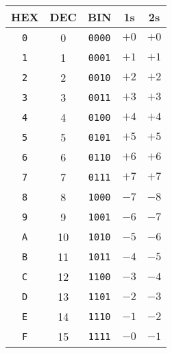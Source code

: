 \begin{tabular*}{\linewidth}{@{\extracolsep{\fill}}ccccc}
    \toprule
    HEX        & DEC & BIN           & 1s   & 2s   \\
    \midrule
    \texttt{0} & 0   & \texttt{0000} & $+0$ & $+0$ \\
    \texttt{1} & 1   & \texttt{0001} & $+1$ & $+1$ \\
    \texttt{2} & 2   & \texttt{0010} & $+2$ & $+2$ \\
    \texttt{3} & 3   & \texttt{0011} & $+3$ & $+3$ \\
    \texttt{4} & 4   & \texttt{0100} & $+4$ & $+4$ \\
    \texttt{5} & 5   & \texttt{0101} & $+5$ & $+5$ \\
    \texttt{6} & 6   & \texttt{0110} & $+6$ & $+6$ \\
    \texttt{7} & 7   & \texttt{0111} & $+7$ & $+7$ \\
    \texttt{8} & 8   & \texttt{1000} & $-7$ & $-8$ \\
    \texttt{9} & 9   & \texttt{1001} & $-6$ & $-7$ \\
    \texttt{A} & 10  & \texttt{1010} & $-5$ & $-6$ \\
    \texttt{B} & 11  & \texttt{1011} & $-4$ & $-5$ \\
    \texttt{C} & 12  & \texttt{1100} & $-3$ & $-4$ \\
    \texttt{D} & 13  & \texttt{1101} & $-2$ & $-3$ \\
    \texttt{E} & 14  & \texttt{1110} & $-1$ & $-2$ \\
    \texttt{F} & 15  & \texttt{1111} & $-0$ & $-1$ \\
    \bottomrule
\end{tabular*}
